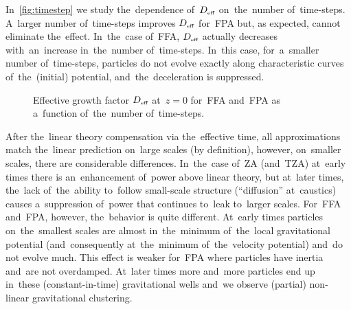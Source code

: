In~\autoref{fig:timestep} we study the~dependence of~$D_\text{\tiny eff}$ on~the~number of~time-steps. A~larger number of~time-steps improves $D_\text{\tiny eff}$ for~FPA but, as expected, cannot eliminate the~effect. In~the~case of~FFA, $D_\text{\tiny eff}$ actually decreases with~an~increase in~the~number of~time-steps. In~this case, for~a~smaller number of~time-steps, particles do not evolve exactly along characteristic curves of~the~(initial) potential, and~the~deceleration is suppressed.
\begin{figure}[!bt]
  \centering
    \begin{subfigure}{0.9\textwidth}
	\end{subfigure}
	\begin{subfigure}{0.9\textwidth}
	\end{subfigure}
  \caption{Effective growth factor $D_\text{\tiny eff}$ at~$z=0$ for~FFA and~FPA as a~function of~the~number of~time-steps.}
  \label{fig:timestep}
\end{figure}

After the~linear theory compensation via the~effective time, all approximations match the~linear prediction on~large scales (by definition), however, on~smaller scales, there are considerable differences. In~the~case of~ZA (and~TZA) at~early times there is an~enhancement of~power above linear theory, but at~later times, the~lack of~the~ability to~follow small-scale structure (``diffusion'' at~caustics) causes a~suppression of~power that continues to~leak to~larger scales. For~FFA and~FPA, however, the~behavior is quite different. At~early times particles on~the~smallest scales are almost in~the~minimum of~the~local gravitational potential (and~consequently at~the~minimum of~the~velocity potential) and~do not evolve much. This effect is weaker for~FPA where particles have inertia and~are not overdamped. At~later times more and~more particles end up in~these (constant-in-time) gravitational wells and~we observe (partial) non-linear gravitational clustering.

